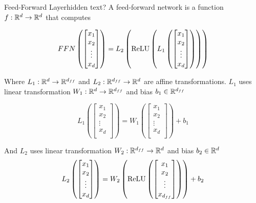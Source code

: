 \begin{definition}{Feed-Forward Layer}{hidden text?}
    A feed-forward network is a function $f:\mathbb{R}^d\to \mathbb{R}^d$ that computes 

    \[FFN\left(\begin{bmatrix}
        x_1\\
        x_2\\
        \vdots\\
        x_d\\
    \end{bmatrix}\right)= L_2\left(\text{ReLU}\left(L_1\left(\begin{bmatrix}
        x_1\\
        x_2\\
        \vdots\\
        x_d\\
    \end{bmatrix}\right)\right)\right)\]

    Where $L_1: \mathbb{R}^d \to \mathbb{R}^{d_{ff}}$ and $L_2: \mathbb{R}^{d_{ff}} \to \mathbb{R}^{d}$ are affine transformations. $L_1$ uses linear transformation $W_1:\mathbb{R}^d\to \mathbb{R}^{d_{ff}}$ and bias $b_1\in\mathbb{R}^{d_{ff}}$

    \[L_1\left(\begin{bmatrix}
        x_1\\
        x_2\\
        \vdots\\
        x_d\\
    \end{bmatrix}\right)=W_1\left(\begin{bmatrix}
        x_1\\
        x_2\\
        \vdots\\
        x_{d}\\
    \end{bmatrix}\right)+b_1\]

    And $L_2$ uses linear transformation $W_2:\mathbb{R}^{d_{ff}}\to \mathbb{R}^d$ and bias $b_2\in\mathbb{R}^{d}$
    \[L_2\left(\begin{bmatrix}
        x_1\\
        x_2\\
        \vdots\\
        x_d\\    \end{bmatrix}\right)=W_2\left(\text{ReLU}\left(\begin{bmatrix}
        x_1\\
        x_2\\
        \vdots\\
        x_{d_{ff}}\\
    \end{bmatrix}\right)\right)+b_2\]
\end{definition}

